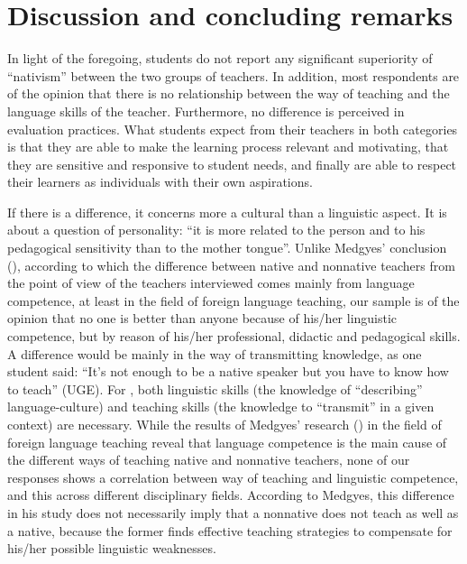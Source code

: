 \documentclass[output=paper]{../langscibook}
\begin{document}
\section{Discussion and concluding remarks}

In light of the foregoing, students do not report any significant superiority of “nativism” between the two groups of teachers. In addition, most respondents are of the opinion that there is no relationship between the way of teaching and the language skills of the teacher. Furthermore, no difference is perceived in evaluation practices. What students expect from their teachers in both categories is that they are able to make the learning process relevant and motivating, that they are sensitive and responsive to student needs, and finally are able to respect their learners as individuals with their own aspirations.

If there is a difference, it concerns more a cultural than a linguistic aspect. It is about a question of personality: “it is more related to the person and to his pedagogical sensitivity than to the mother tongue”. Unlike Medgyes’ conclusion (\citeyear{Medgyes1992,Medgyes1994}), according to which the difference between native and nonnative teachers from the point of view of the teachers interviewed comes mainly from language competence, at least in the field of foreign language teaching, our sample is of the opinion that no one is better than anyone because of his/her linguistic competence, but by reason of his/her professional, didactic and pedagogical skills. A difference would be mainly in the way of transmitting knowledge, as one student said: “It’s not enough to be a native speaker but you have to know how to teach” (UGE). For \citet[104]{Bento2011}, both linguistic skills (the knowledge of “describing” language-culture) and teaching skills (the knowledge to “transmit” in a given context) are necessary. While the results of Medgyes’ research (\citeyear{Medgyes1992,Medgyes1994}) in the field of foreign language teaching reveal that language competence is the main cause of the different ways of teaching native and nonnative teachers, none of our responses shows a correlation between way of teaching and linguistic competence, and this across different disciplinary fields. According to Medgyes, this difference in his study does not necessarily imply that a nonnative does not teach as well as a native, because the former finds effective teaching strategies to compensate for his/her possible linguistic weaknesses. 
\end{document}
